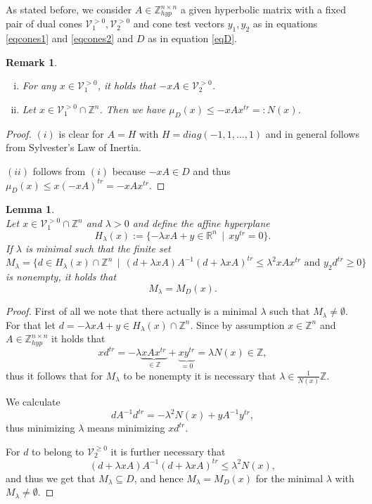 \documentclass[10pt, preprint]{elsarticle}
\newtheorem{lemma}[theorem]{Lemma}
\newtheorem{remark}[theorem]{Remark}
\theoremstyle{definition}
\theoremstyle{definition}
\newcommand{\Z}{\mathbb{Z}}
\newcommand{\R}{\mathbb{R}}
\newcommand{\V}{\mathcal{V}}
\newcommand{\Zhyp}{\Z^{n\times n}_{hyp}}
\newcommand{\Vgt}{\V_1^{>0}}
\newcommand{\Wgt}{\V_2^{>0}}
\newcommand{\Wgeq}{\V_2^{\geq 0}}
\begin{document}
As stated before, we consider $A\in\Zhyp$ a given hyperbolic matrix with a fixed pair of dual cones $\Vgt,\Wgt$ and cone test vectors $y_1,y_2$ as in equations \eqref{eqcones1} and \eqref{eqcones2} and $D$ as in equation \eqref{eqD}.
\begin{remark}\mbox{}
\begin{enumerate}[(i)]
\item For any $x\in\Vgt$, it holds that $-xA\in\Wgt$.
\item Let $x\in\Vgt\cap\Z^n$. Then we have $\mu_D(x)\leq -xAx^{tr}=:N(x)$.
\end{enumerate}
\end{remark}
\begin{proof}
$(i)$ is clear for $A=H$ with $H=diag(-1,1,\dots ,1)$ and in general follows from Sylvester's Law of Inertia.

$(ii)$ follows from $(i)$ because $-xA\in D$ and thus $\mu_D(x)\leq x(-xA)^{tr}=-xAx^{tr}$.
\end{proof}
\begin{lemma} \mbox{}\\
Let $x\in\Vgt\cap\Z^n$ and $\lambda>0$ and define the affine hyperplane
\[H_\lambda(x):=\{-\lambda xA+y\in\R^n\,\mid\,xy^{tr}=0\}.\]
If $\lambda$ is minimal such that the finite set
\[M_\lambda=\{d\in H_\lambda (x)\cap\Z^n\,\mid\, (d+\lambda xA)A^{-1}(d+\lambda xA)^{tr}\leq \lambda^2xAx^{tr}\text{ and }y_2d^{tr}\geq 0\}\]
is nonempty, it holds that
\[M_\lambda=M_D(x).\]
\end{lemma}
\begin{proof}
First of all we note that there actually is a minimal $\lambda$ such that $M_\lambda\neq\emptyset$. For that let $d=-\lambda xA+y\in H_\lambda(x)\cap\Z^n$. Since by assumption $x\in\Z^n$ and $A\in\Zhyp$ it holds that
\[xd^{tr}=-\lambda \underbrace{xAx^{tr}}_{\in\Z}+\underbrace{xy^{tr}}_{=0}=\lambda N(x)\in\Z,\]
thus it follows that for $M_\lambda$ to be nonempty it is necessary that $\lambda\in\tfrac{1}{N(x)}\Z$. 

We calculate 
\[dA^{-1}d^{tr}=-\lambda^2N(x)+yA^{-1}y^{tr},\]
thus minimizing $\lambda$ means minimizing $xd^{tr}$.

For $d$ to belong to $\Wgeq$ it is further necessary that
\[(d+\lambda xA)A^{-1}(d+\lambda xA)^{tr}\leq \lambda^2 N(x),\]
and thus we get that $M_\lambda\subseteq D$, and hence $M_\lambda=M_D(x)$ for the minimal $\lambda$ with $M_\lambda\neq\emptyset$.
\end{proof}
\end{document}
